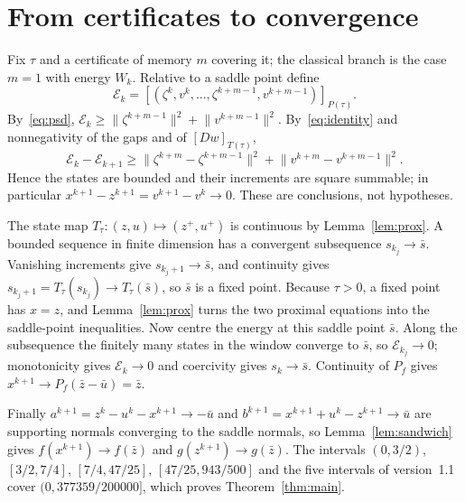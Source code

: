 \documentclass[11pt]{article}
\numberwithin{equation}{section}
\theoremstyle{definition}
\theoremstyle{remark}
\newcommand{\norm}[1]{\lVert #1\rVert}
\newcommand{\taulo}{943/500}
\newcommand{\taunew}{377359/200000}
\begin{document}
\section{From certificates to convergence}\label{sec:convergence}
Fix $\tau$ and a certificate of memory $m$ covering it; the classical branch is the case $m=1$ with energy $W_k$. Relative to a saddle point define
\[
\mathcal E_k=[(\zeta^k,v^k,\dots,\zeta^{k+m-1},v^{k+m-1})]_{P(\tau)}.
\]
By~\eqref{eq:psd}, $\mathcal E_k\ge\norm{\zeta^{k+m-1}}^2+\norm{v^{k+m-1}}^2$. By~\eqref{eq:identity} and nonnegativity of the gaps and of $[Dw]_{T(\tau)}$,
\[
\mathcal E_k-\mathcal E_{k+1}\ge\norm{\zeta^{k+m}-\zeta^{k+m-1}}^2+\norm{v^{k+m}-v^{k+m-1}}^2.
\]
Hence the states are bounded and their increments are square summable; in particular $x^{k+1}-z^{k+1}=v^{k+1}-v^k\to0$. These are conclusions, not hypotheses.

The state map $T_\tau:(z,u)\mapsto(z^+,u^+)$ is continuous by Lemma~\ref{lem:prox}. A bounded sequence in finite dimension has a convergent subsequence $s_{k_j}\to\bar s$. Vanishing increments give $s_{k_j+1}\to\bar s$, and continuity gives $s_{k_j+1}=T_\tau(s_{k_j})\to T_\tau(\bar s)$, so $\bar s$ is a fixed point. Because $\tau>0$, a fixed point has $x=z$, and Lemma~\ref{lem:prox} turns the two proximal equations into the saddle-point inequalities. Now centre the energy at this saddle point $\bar s$. Along the subsequence the finitely many states in the window converge to $\bar s$, so $\mathcal E_{k_j}\to0$; monotonicity gives $\mathcal E_k\to0$ and coercivity gives $s_k\to\bar s$. Continuity of $P_f$ gives $x^{k+1}\to P_f(\bar z-\bar u)=\bar z$.

Finally $a^{k+1}=z^k-u^k-x^{k+1}\to-\bar u$ and $b^{k+1}=x^{k+1}+u^k-z^{k+1}\to\bar u$ are supporting normals converging to the saddle normals, so Lemma~\ref{lem:sandwich} gives $f(x^{k+1})\to f(\bar z)$ and $g(z^{k+1})\to g(\bar z)$. The intervals $(0,3/2)$, $[3/2,7/4]$, $[7/4,47/25]$, $[47/25,\taulo]$ and the five intervals of version~1.1 cover $(0,\taunew]$, which proves Theorem~\ref{thm:main}.
\end{document}
